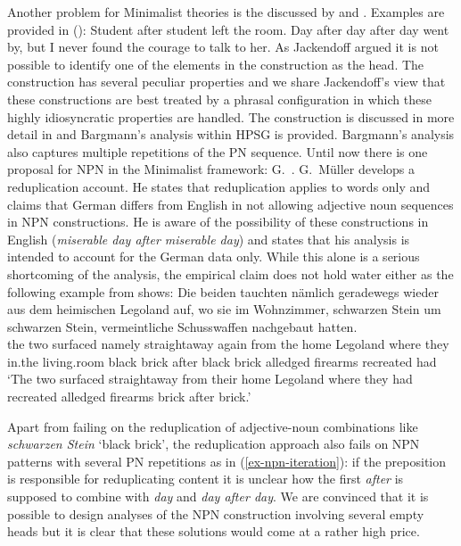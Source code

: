 \documentclass[output=paper]{langsci/langscibook}
\begin{document}
Another problem for Minimalist theories is the  discussed by \citet{Matsuyama2004a} and \citet{Jackendoff2008a}. Examples are provided in ():
\eal
\ex Student after student left the room.
\ex
\label{ex-npn-iteration}
Day after day after day went by, but I never found the courage to talk to
her. \citep{Bargmann2015a}
\zl
As Jackendoff argued it is not possible to identify one of the elements in the construction as the
head. The construction has several peculiar properties and we share Jackendoff's view that these
constructions are best treated by a phrasal configuration in which these highly idiosyncratic
properties are handled. The construction is discussed in more detail in  and
Bargmann's analysis within HPSG is provided. Bargmann's analysis also captures multiple repetitions
of the PN sequence. Until now there is one proposal for NPN in the Minimalist framework:
G.\ \citet{GMueller2011a}. G.\ Müller develops a reduplication account. He states that reduplication
applies to words only and claims that German differs from English in not allowing adjective noun
sequences in NPN constructions. He is aware of the possibility of these constructions in English
(\emph{miserable day after miserable day}) and states that his analysis is intended to account for
the German data only. While this alone is a serious shortcoming of the analysis, the empirical claim
does not hold water either as the following example from  shows:
\ea
\gll Die beiden tauchten nämlich geradewegs wieder aus dem heimischen Legoland auf, wo sie im
Wohnzimmer, schwarzen Stein um schwarzen Stein, vermeintliche Schusswaffen nachgebaut
hatten.\footnotemark\\
     the two    surfaced namely straightaway again   from the home Legoland \particle{} where they
     in.the living.room black brick after black brick alledged firearms recreated had\\%
{}
\glt `The two surfaced straightaway from their home Legoland where they had recreated alledged
firearms brick after brick.'
\z
\begin{sloppypar}
Apart from failing on the reduplication of adjective-noun combinations like \emph{schwar\-zen Stein}
`black brick', the reduplication approach also fails on NPN patterns with several PN repetitions as
in (\ref{ex-npn-iteration}): if the preposition is responsible for reduplicating content it is
unclear how the first \emph{after} is supposed to combine with \emph{day} and \emph{day after
  day}. We are convinced that it is possible to design analyses of the NPN construction involving
several empty heads but it is clear that these solutions would come at a rather high price.
\end{sloppypar}
\end{document}

